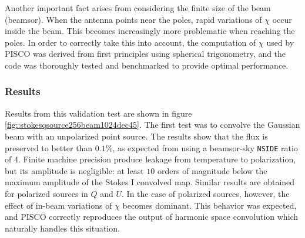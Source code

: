 \documentclass[a4paper,fleqn]{cas-dc}\sloppy
\begin{document}
	Another important fact arises from considering the finite size of the beam (beamsor). When the antenna points near the poles, rapid variations of $\chi$ occur inside the beam. This becomes increasingly more problematic when reaching the poles. In order to correctly take this into account, the computation of $\chi$ used by PISCO was derived from first principles using spherical trigonometry, and the code was thoroughly tested and benchmarked to provide optimal performance. 
	
	\subsubsection{Results}
	
	Results from this validation test are shown in figure \ref{fig::stokesqsource256beam1024dec45}. The first test was to convolve the Gaussian beam with an unpolarized point source. The results show that the flux is preserved to better than $0.1\%$, as expected from using a beamsor-sky \texttt{NSIDE} ratio of 4. Finite machine precision produce leakage from temperature to polarization, but its amplitude is negligible: at least $10$ orders of magnitude below the maximum amplitude of the Stokes I convolved map. Similar results are obtained for polarized sources in $Q$ and $U$. In the case of polarized sources, however, the effect of in-beam variations of $\chi$ becomes dominant. This behavior was expected, and PISCO correctly reproduces the output of harmonic space convolution which naturally handles this situation.
	
\end{document}
